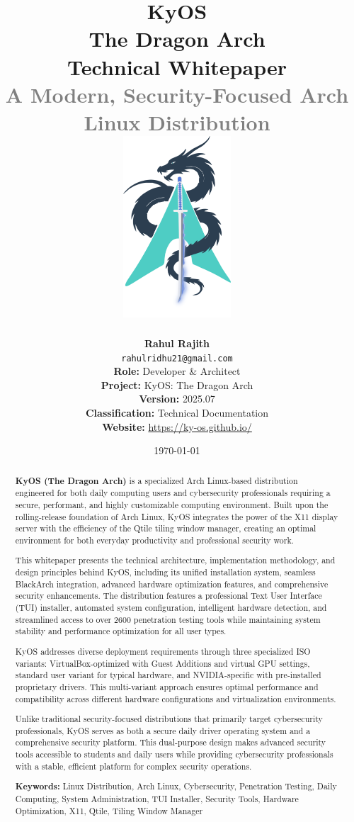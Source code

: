 \documentclass[12pt,a4paper]{article}
\title{
    \Huge\textbf{\textcolor{kyosblue}{KyOS}}\\
    \Large\textcolor{kyosdark}{The Dragon Arch}\\
    \LARGE\textcolor{kyosdark}{Technical Whitepaper}\\
    \large\textcolor{gray}{A Modern, Security-Focused Arch Linux Distribution}\\
    \vspace{1cm}
    \includegraphics[width=0.3\textwidth]{kyos.png}
}
\author{
    \textbf{Rahul Rajith}\\
    \texttt{rahulridhu21@gmail.com}\\
    \vspace{0.5cm}
    \textbf{Role:} Developer \& Architect\\
    \textbf{Project:} KyOS: The Dragon Arch\\
    \textbf{Version:} 2025.07\\
    \textbf{Classification:} Technical Documentation\\
    \vspace{0.5cm}
    \textbf{Website:} \url{https://ky-os.github.io/}\\
}
\date{\today}
\begin{document}
\maketitle
\thispagestyle{empty}

\newpage

\begin{abstract}
\textbf{KyOS (The Dragon Arch)} is a specialized Arch Linux-based distribution engineered for both daily computing users and cybersecurity professionals requiring a secure, performant, and highly customizable computing environment. Built upon the rolling-release foundation of Arch Linux, KyOS integrates the power of the X11 display server with the efficiency of the Qtile tiling window manager, creating an optimal environment for both everyday productivity and professional security work. 

This whitepaper presents the technical architecture, implementation methodology, and design principles behind KyOS, including its unified installation system, seamless BlackArch integration, advanced hardware optimization features, and comprehensive security enhancements. The distribution features a professional Text User Interface (TUI) installer, automated system configuration, intelligent hardware detection, and streamlined access to over 2600 penetration testing tools while maintaining system stability and performance optimization for all user types.

KyOS addresses diverse deployment requirements through three specialized ISO variants: VirtualBox-optimized with Guest Additions and virtual GPU settings, standard user variant for typical hardware, and NVIDIA-specific with pre-installed proprietary drivers. This multi-variant approach ensures optimal performance and compatibility across different hardware configurations and virtualization environments.

Unlike traditional security-focused distributions that primarily target cybersecurity professionals, KyOS serves as both a secure daily driver operating system and a comprehensive security platform. This dual-purpose design makes advanced security tools accessible to students and daily users while providing cybersecurity professionals with a stable, efficient platform for complex security operations.

\textbf{Keywords:} Linux Distribution, Arch Linux, Cybersecurity, Penetration Testing, Daily Computing, System Administration, TUI Installer, Security Tools, Hardware Optimization, X11, Qtile, Tiling Window Manager
\end{abstract}
\end{document}
